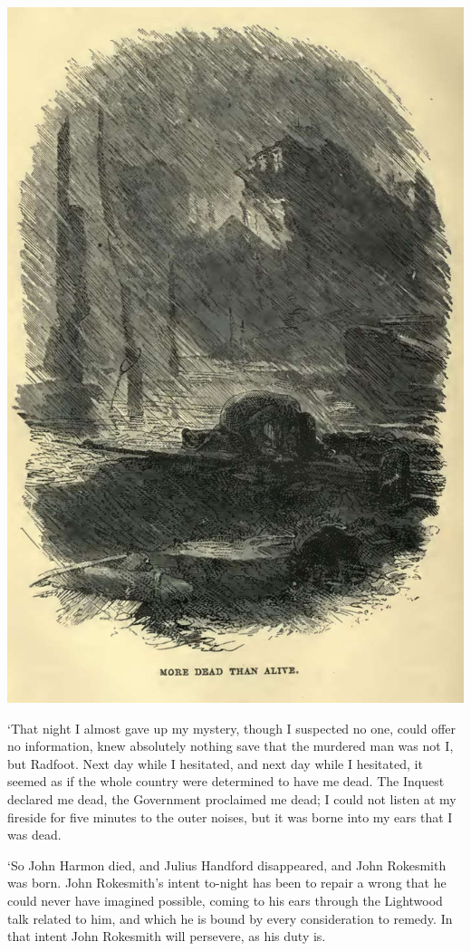 \includegraphics[scale=2.3]{02-13-01}

‘That night I almost gave up my mystery, though I suspected no one,
could offer no information, knew absolutely nothing save that the
murdered man was not I, but Radfoot. Next day while I hesitated, and
next day while I hesitated, it seemed as if the whole country were
determined to have me dead. The Inquest declared me dead, the Government
proclaimed me dead; I could not listen at my fireside for five minutes
to the outer noises, but it was borne into my ears that I was dead.

‘So John Harmon died, and Julius Handford disappeared, and John
Rokesmith was born. John Rokesmith’s intent to-night has been to repair
a wrong that he could never have imagined possible, coming to his ears
through the Lightwood talk related to him, and which he is bound by
every consideration to remedy. In that intent John Rokesmith will
persevere, as his duty is.

